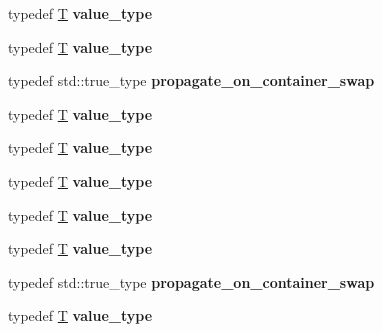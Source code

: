 \begin{DoxyCompactItemize}
\mbox{\label{structsome__alloc_a41022544a2b3ffeb4ffce92f759eb30b}} 
typedef \mbox{\hyperlink{struct_t}{T}} {\bfseries value\+\_\+type}
\item 
\mbox{\label{structsome__alloc_a41022544a2b3ffeb4ffce92f759eb30b}} 
typedef \mbox{\hyperlink{struct_t}{T}} {\bfseries value\+\_\+type}
\item 
\mbox{\label{structsome__alloc_aad61c49c6ad5f1ca6dfb3f5d38d70d57}} 
typedef std\+::true\+\_\+type {\bfseries propagate\+\_\+on\+\_\+container\+\_\+swap}
\item 
\mbox{\label{structsome__alloc_a41022544a2b3ffeb4ffce92f759eb30b}} 
typedef \mbox{\hyperlink{struct_t}{T}} {\bfseries value\+\_\+type}
\item 
\mbox{\label{structsome__alloc_a41022544a2b3ffeb4ffce92f759eb30b}} 
typedef \mbox{\hyperlink{struct_t}{T}} {\bfseries value\+\_\+type}
\item 
\mbox{\label{structsome__alloc_a41022544a2b3ffeb4ffce92f759eb30b}} 
typedef \mbox{\hyperlink{struct_t}{T}} {\bfseries value\+\_\+type}
\item 
\mbox{\label{structsome__alloc_a41022544a2b3ffeb4ffce92f759eb30b}} 
typedef \mbox{\hyperlink{struct_t}{T}} {\bfseries value\+\_\+type}
\item 
\mbox{\label{structsome__alloc_a41022544a2b3ffeb4ffce92f759eb30b}} 
typedef \mbox{\hyperlink{struct_t}{T}} {\bfseries value\+\_\+type}
\item 
\mbox{\label{structsome__alloc_aad61c49c6ad5f1ca6dfb3f5d38d70d57}} 
typedef std\+::true\+\_\+type {\bfseries propagate\+\_\+on\+\_\+container\+\_\+swap}
\item 
\mbox{\label{structsome__alloc_a41022544a2b3ffeb4ffce92f759eb30b}} 
typedef \mbox{\hyperlink{struct_t}{T}} {\bfseries value\+\_\+type}
\item 
\mbox{\label{structsome__alloc_aad61c49c6ad5f1ca6dfb3f5d38d70d57}} 

\end{DoxyCompactItemize}
